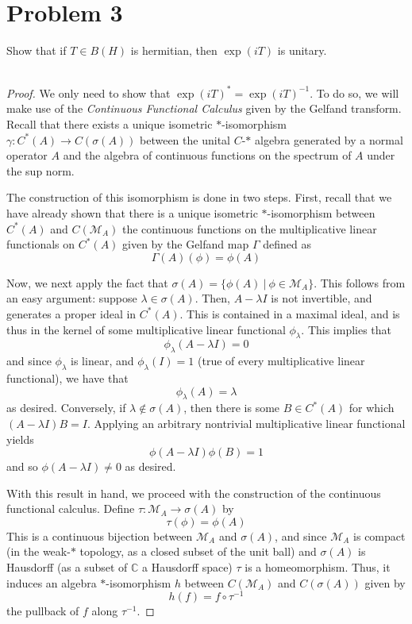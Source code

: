 \documentclass[fontsize=11pt]{scrartcl} %
\numberwithin{equation}{section} %
\numberwithin{figure}{section} %
\numberwithin{table}{section} %
\newcommand{\C}{\mathbb{C}}
\begin{document}
\section*{Problem 3}
Show that if $T\in B(H)$ is hermitian, then $\exp(iT)$ is unitary.
\\
\\
\begin{proof}
    We only need to show that $\exp(iT)^* = \exp(iT)^{-1}$. To do so, we will
    make use of the {\em Continuous Functional Calculus} given by the Gelfand
    transform. Recall that there exists a unique isometric $*$-isomorphism $\gamma:
    C^*(A)\to C(\sigma(A))$ between the unital $C$-$*$ algebra generated by a
    normal operator $A$ and the algebra of continuous functions on the spectrum
    of $A$ under the sup norm.

    The construction of this isomorphism is done in two steps. First, recall
    that we have already shown that there is a unique isometric $*$-isomorphism
    between $C^*(A)$ and $C(\mathscr{M}_A)$ the continuous functions on the
    multiplicative linear functionals on $C^*(A)$ given by the Gelfand map $\Gamma$
    defined as
    \[
        \Gamma(A)(\phi) = \phi(A)
    \]
    
    Now, we next apply the fact that $\sigma(A) = \{\phi(A)\ |\ \phi\in
    \mathscr{M}_A\}$. This follows from an easy argument: suppose
    $\lambda\in\sigma(A)$. Then, $A-\lambda I$ is not invertible, and generates
    a proper ideal in $C^*(A)$. This is contained in a maximal ideal, and is
    thus in the kernel of some multiplicative linear functional
    $\phi_{\lambda}$. This implies that
    \[
        \phi_{\lambda}(A-\lambda I) = 0
    \]
    and since $\phi_{\lambda}$ is linear, and $\phi_{\lambda}(I)=1$ (true of
    every multiplicative linear functional), we have that
    \[
        \phi_{\lambda}(A) = \lambda
    \]
    as desired. Conversely, if $\lambda\not\in\sigma(A)$, then there is some
    $B\in C^*(A)$ for which $(A-\lambda I)B =I$. Applying an arbitrary
    nontrivial multiplicative linear functional yields
    \[
        \phi(A-\lambda I)\phi(B) = 1
    \]
    and so $\phi(A-\lambda I)\neq 0$ as desired.

    With this result in hand, we proceed with the construction of the continuous
    functional calculus. Define $\tau:\mathscr{M}_A\to \sigma(A)$ by
    \[
        \tau(\phi) = \phi(A)
    \]
    This is a continuous bijection between $\mathscr{M}_A$ and $\sigma(A)$, and
    since $\mathscr{M}_A$ is compact (in the weak-$*$ topology, as a closed
    subset of the unit ball) and $\sigma(A)$ is Hausdorff (as a subset of $\C$ a
    Hausdorff space) $\tau$ is a homeomorphism. Thus, it induces an algebra
    $*$-isomorphism $h$ between $C(\mathscr{M}_A)$ and $C(\sigma(A))$ given by
    \[
        h(f) = f\circ\tau^{-1}
    \]
    the pullback of $f$ along $\tau^{-1}$.


\end{proof}
\end{document}
